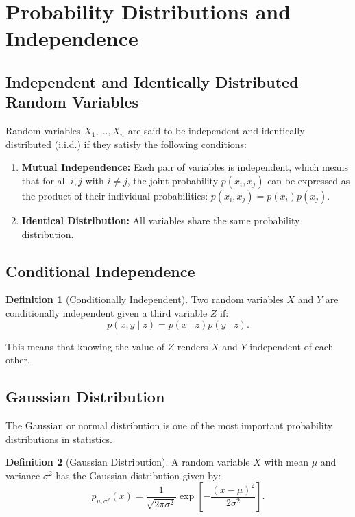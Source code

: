 \documentclass[12pt,openany]{book}
\theoremstyle{definition}
\newtheorem{definition}{Definition}[chapter]
\begin{document}
	\section{Probability Distributions and Independence}
	
	\subsection{Independent and Identically Distributed Random Variables}
	
	Random variables \( X_1, \dots, X_n \) are said to be independent and identically distributed (i.i.d.) if they satisfy the following conditions:
	
	\begin{enumerate}[(1)]
		\item \textbf{Mutual Independence:} Each pair of variables is independent, which means that for all \( i, j \) with \( i \neq j \), the joint probability \( p(x_i, x_j) \) can be expressed as the product of their individual probabilities: \( p(x_i, x_j) = p(x_i)p(x_j) \).
		\item \textbf{Identical Distribution:} All variables share the same probability distribution.
	\end{enumerate}
	
	\subsection{Conditional Independence}
	
	\begin{definition}[Conditionally Independent]
		Two random variables \( X \) and \( Y \) are conditionally independent given a third variable \( Z \) if:
		\[
		p(x, y \mid z) = p(x \mid z)p(y \mid z).
		\]
	\end{definition}
	
	This means that knowing the value of \( Z \) renders \( X \) and \( Y \) independent of each other.
	
	\subsection{Gaussian Distribution}
	
	The Gaussian or normal distribution is one of the most important probability distributions in statistics.
	
	\begin{definition}[Gaussian Distribution]
		A random variable \( X \) with mean \( \mu \) and variance \( \sigma^2 \) has the Gaussian distribution given by:
		\[
		p_{\mu, \sigma^2}(x) = \frac{1}{\sqrt{2\pi\sigma^2}}\exp\left[-\frac{(x - \mu)^2}{2\sigma^2}\right].
		\]
	\end{definition}
	
\end{document}
